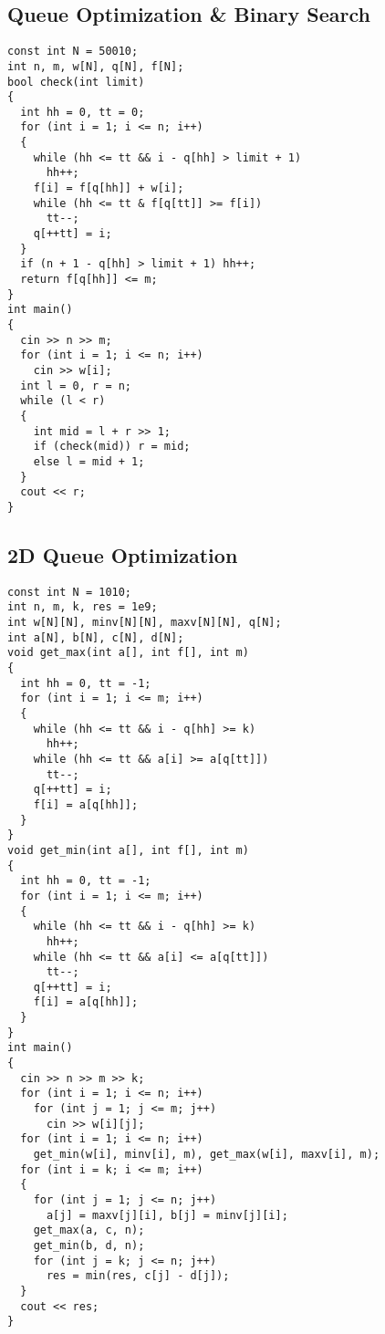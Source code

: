 \subsection{Queue Optimization \& Binary Search}
\begin{lstlisting}
const int N = 50010;
int n, m, w[N], q[N], f[N];
bool check(int limit)
{
  int hh = 0, tt = 0;
  for (int i = 1; i <= n; i++)
  {
    while (hh <= tt && i - q[hh] > limit + 1)
      hh++;
    f[i] = f[q[hh]] + w[i];
    while (hh <= tt & f[q[tt]] >= f[i])
      tt--;
    q[++tt] = i;
  }
  if (n + 1 - q[hh] > limit + 1) hh++;
  return f[q[hh]] <= m;
}
int main()
{
  cin >> n >> m;
  for (int i = 1; i <= n; i++)
    cin >> w[i];
  int l = 0, r = n;
  while (l < r)
  {
    int mid = l + r >> 1;
    if (check(mid)) r = mid;
    else l = mid + 1;
  }
  cout << r;
}
\end{lstlisting}
\subsection{2D Queue Optimization}
\begin{lstlisting}
const int N = 1010;
int n, m, k, res = 1e9;
int w[N][N], minv[N][N], maxv[N][N], q[N];
int a[N], b[N], c[N], d[N];
void get_max(int a[], int f[], int m)
{
  int hh = 0, tt = -1;
  for (int i = 1; i <= m; i++)
  {
    while (hh <= tt && i - q[hh] >= k)
      hh++;
    while (hh <= tt && a[i] >= a[q[tt]])
      tt--;
    q[++tt] = i;
    f[i] = a[q[hh]];
  }
}
void get_min(int a[], int f[], int m)
{
  int hh = 0, tt = -1;
  for (int i = 1; i <= m; i++)
  {
    while (hh <= tt && i - q[hh] >= k)
      hh++;
    while (hh <= tt && a[i] <= a[q[tt]])
      tt--;
    q[++tt] = i;
    f[i] = a[q[hh]];
  }
}
int main()
{
  cin >> n >> m >> k;
  for (int i = 1; i <= n; i++)
    for (int j = 1; j <= m; j++)
      cin >> w[i][j];
  for (int i = 1; i <= n; i++)
    get_min(w[i], minv[i], m), get_max(w[i], maxv[i], m);
  for (int i = k; i <= m; i++)
  {
    for (int j = 1; j <= n; j++)
      a[j] = maxv[j][i], b[j] = minv[j][i];
    get_max(a, c, n);
    get_min(b, d, n);
    for (int j = k; j <= n; j++)
      res = min(res, c[j] - d[j]);
  }
  cout << res;
}
\end{lstlisting}